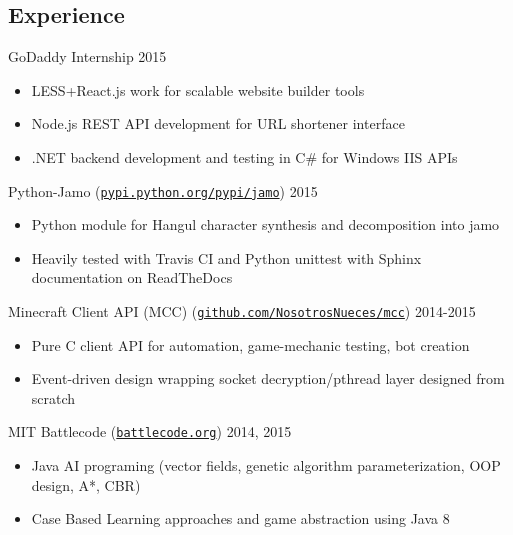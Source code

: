 \documentclass[line,margin]{res}
\begin{document}
\begin{resume}
\vspace{-8pt}
\section{Experience} 
    \vspace{12pt}
    GoDaddy Internship
    \hfill  2015
        \begin{itemize} \itemsep -2pt
        \item LESS+React.js work for scalable website builder tools
        \item Node.js REST API development for URL shortener interface
        \item .NET backend development and testing in C\# for Windows IIS APIs
        \end{itemize}

    \vspace{-6pt}
    Python-Jamo
    (\href{https://pypi.python.org/pypi/jamo}{\texttt{pypi.python.org/pypi/jamo}})
    \hfill  2015
        \begin{itemize} \itemsep -2pt
        \item Python module for Hangul character synthesis and decomposition into jamo
        \item Heavily tested with Travis CI and Python unittest with Sphinx documentation on ReadTheDocs
        \end{itemize}

    \vspace{-6pt}
    Minecraft Client API (MCC)
    (\href{https://www.github.com/NosotrosNueces/mcc}{\texttt{github.com/NosotrosNueces/mcc}})
    \hfill  2014-2015
        \begin{itemize} \itemsep -2pt
        \item Pure C client API for automation, game-mechanic testing, bot creation
        \item Event-driven design wrapping socket decryption/pthread layer designed from scratch
        \end{itemize}

    \vspace{-6pt}
    MIT Battlecode
    (\href{http://www.battlecode.org/}{\texttt{battlecode.org}})
    \hfill  2014, 2015
        \begin{itemize} \itemsep -2pt
        \item Java AI programing (vector fields, genetic algorithm parameterization, OOP design, A*, CBR)
        \item Case Based Learning approaches and game abstraction using Java 8
        \end{itemize}


\end{resume}
\end{document}
